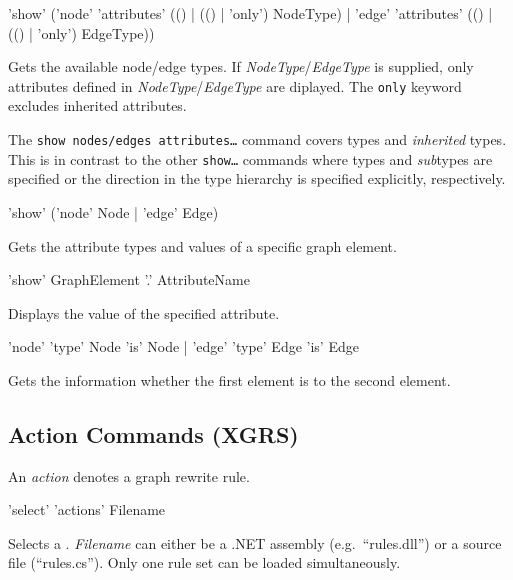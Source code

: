 \begin{rail}
  'show' ('node' 'attributes' (() | (() | 'only') NodeType) | 'edge' 'attributes' (() | (() | 'only') EdgeType))
\end{rail}
Gets the available node/edge  types.
If \emph{NodeType}/\emph{EdgeType} is supplied, only attributes defined in \emph{NodeType}/\emph{EdgeType} are diplayed.
The \texttt{only} keyword excludes inherited attributes.\\
\begin{note}
The \texttt{show nodes/edges attributes\dots} command covers types and \emph{inherited} types.
This is in contrast to the other \texttt{show\dots} commands where types and \emph{sub}types are specified or the direction in the type hierarchy is specified explicitly, respectively.
\end{note}

\begin{rail}
 'show' ('node' Node | 'edge' Edge)
\end{rail}
Gets the attribute types and values of a specific graph element.

\begin{rail}
  'show' GraphElement '.' AttributeName
\end{rail}
Displays the value of the specified attribute.

\begin{rail}
  'node' 'type' Node 'is' Node | 'edge' 'type' Edge 'is' Edge
\end{rail}
Gets the information whether the first element is  to the second element.


\subsection{Action Commands (XGRS)}
\label{grsthings}
An \emph{action} denotes a graph rewrite rule.

\begin{rail}
  'select' 'actions' Filename
\end{rail}
Selects a .
\emph{Filename} can either be a .NET assembly (e.g.\ ``rules.dll'') or a source file (``rules.cs'').
Only one rule set can be loaded simultaneously.

